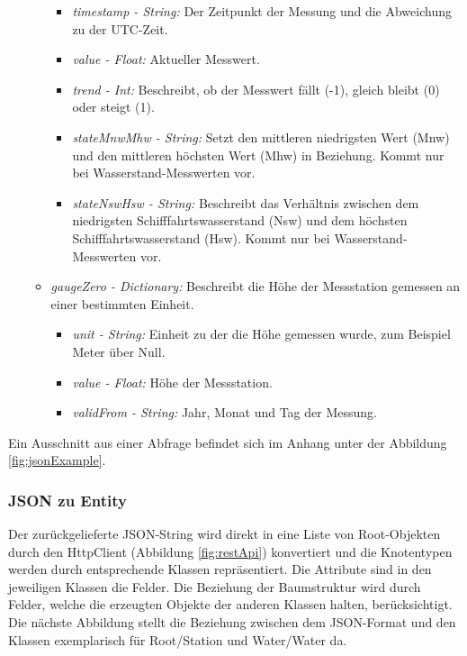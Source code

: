 \begin{itemize}
\begin{itemize}
        \begin{itemize}
            \item \textit{timestamp - String:} Der Zeitpunkt der Messung und die Abweichung zu der UTC-Zeit.
            \item \textit{value - Float:} Aktueller Messwert.
            \item \textit{trend - Int:} Beschreibt, ob der Messwert fällt (-1), gleich bleibt (0) oder steigt (1).
            \item \textit{stateMnwMhw - String:} Setzt den mittleren niedrigsten Wert (Mnw) und den mittleren höchsten Wert (Mhw) in Beziehung. Kommt nur bei Wasserstand-Messwerten vor.
            \item \textit{stateNswHsw - String:} Beschreibt das Verhältnis zwischen dem niedrigsten Schifffahrtswasserstand (Nsw) und dem höchsten Schifffahrtswasserstand (Hsw). Kommt nur bei Wasserstand-Messwerten vor.
        \end{itemize}
        \item \textit{gaugeZero - Dictionary:} Beschreibt die Höhe der Messstation gemessen an einer bestimmten Einheit.
        \begin{itemize}
            \item \textit{unit - String:} Einheit zu der die Höhe gemessen wurde, zum Beispiel Meter über Null.
            \item \textit{value - Float:} Höhe der Messstation.
            \item \textit{validFrom - String:} Jahr, Monat und Tag der Messung.
        \end{itemize}
    \end{itemize}  
\end{itemize}
Ein Ausschnitt aus einer Abfrage befindet sich im Anhang unter der Abbildung \ref{fig:jsonExample}.

\subsubsection{JSON zu Entity}
Der zurückgelieferte JSON-String wird direkt in eine Liste von Root-Objekten durch den HttpClient (Abbildung \ref{fig:restApi}) konvertiert und die Knotentypen werden durch entsprechende Klassen repräsentiert.
Die Attribute sind in den jeweiligen Klassen die Felder. Die Beziehung der Baumstruktur wird durch Felder, welche die erzeugten Objekte der anderen Klassen
halten, berücksichtigt. Die nächste Abbildung stellt die Beziehung zwischen dem JSON-Format und den Klassen 
exemplarisch für Root/Station und Water/Water da.

